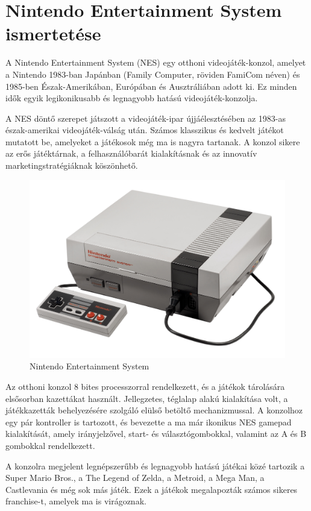 \chapter{Nintendo Entertainment System ismertetése}

A Nintendo Entertainment System (NES) egy otthoni videojáték-konzol, amelyet a Nintendo 1983-ban Japánban (Family Computer, röviden FamiCom néven) és 1985-ben Észak-Amerikában, Európában és Ausztráliában adott ki. Ez minden idők egyik legikonikusabb és legnagyobb hatású videojáték-konzolja.

A NES döntő szerepet játszott a videojáték-ipar újjáélesztésében az 1983-as észak-amerikai videojáték-válság után. Számos klasszikus és kedvelt játékot mutatott be, amelyeket a játékosok még ma is nagyra tartanak. A konzol sikere az erős játéktárnak, a felhasználóbarát kialakításnak és az innovatív marketingstratégiáknak köszönhető.
\begin{figure}[H]
	\centering
	\includegraphics[width=120mm, keepaspectratio]{figures/NES-console-set}
	\caption{Nintendo Entertainment System}
	\label{fig:NES-Consol}
\end{figure}

Az otthoni konzol 8 bites processzorral rendelkezett, és a játékok tárolására elsősorban kazettákat használt. Jellegzetes, téglalap alakú kialakítása volt, a játékkazetták behelyezésére szolgáló elülső betöltő mechanizmussal. A konzolhoz egy pár kontroller is tartozott, és bevezette a ma már ikonikus NES gamepad kialakítását, amely irányjelzővel, start- és választógombokkal, valamint az A és B gombokkal rendelkezett.

A konzolra megjelent legnépszerűbb és legnagyobb hatású játékai közé tartozik a Super Mario Bros., a The Legend of Zelda, a Metroid, a Mega Man, a Castlevania és még sok más játék. Ezek a játékok megalapozták számos sikeres franchise-t, amelyek ma is virágoznak.

